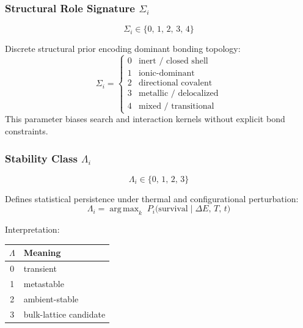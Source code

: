 \documentclass[11pt, a4paper, oneside]{article}
\theoremstyle{definition}
\theoremstyle{remark}
\DeclareMathOperator*{\argmax}{arg\,max}
\begin{document}
\subsubsection{Structural Role Signature
              \texorpdfstring{$\Sigma_i$}{Sigma-i}}
\label{sec:structural-role}

\[
  \Sigma_i \in \{0,\,1,\,2,\,3,\,4\}
\]

Discrete structural prior encoding dominant bonding topology:
%
\[
  \Sigma_i =
  \begin{cases}
    0 & \text{inert / closed shell}    \\
    1 & \text{ionic-dominant}           \\
    2 & \text{directional covalent}     \\
    3 & \text{metallic / delocalized}   \\
    4 & \text{mixed / transitional}
  \end{cases}
\]
%
This parameter biases search and interaction kernels without
explicit bond constraints.

\subsubsection{Stability Class
              \texorpdfstring{$\Lambda_i$}{Lambda-i}}
\label{sec:stability-class}

\[
  \Lambda_i \in \{0,\,1,\,2,\,3\}
\]

Defines statistical persistence under thermal and configurational
perturbation:
%
\begin{equation}
  \Lambda_i = \argmax_k \;
    P_i\!\bigl(\text{survival} \mid \Delta E,\, T,\, t\bigr)
  \label{eq:stability-class}
\end{equation}

Interpretation:
%
\begin{center}
\begin{tabular}{cl}
  \toprule
  $\Lambda$ & Meaning \\
  \midrule
  0 & transient \\
  1 & metastable \\
  2 & ambient-stable \\
  3 & bulk-lattice candidate \\
  \bottomrule
\end{tabular}
\end{center}
\end{document}
